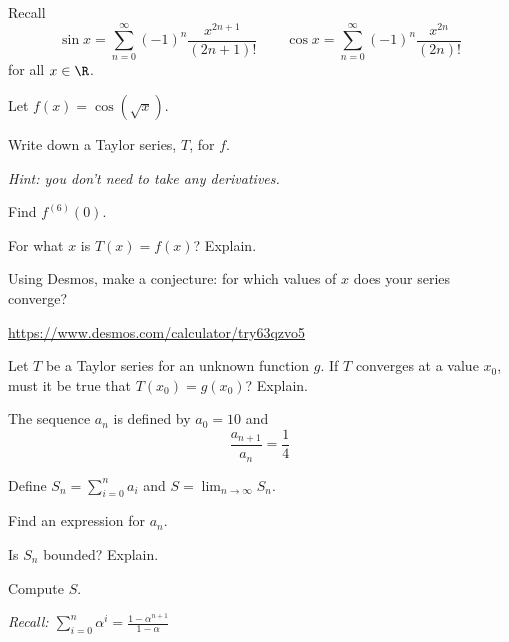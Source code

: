 \documentclass{workbook}
\begin{document}
\begin{slide}
	\question
	Recall
	\[
		\sin x = \sum_{n=0}^\infty (-1)^n\frac{x^{2n+1}}{(2n+1)!}
		\qquad
		\cos x = \sum_{n=0}^\infty (-1)^n\frac{x^{2n}}{(2n)!}
	\]
	for all $x\in\R$.

	Let $f(x)=\cos(\sqrt{x})$.

	\begin{parts}
		\item Write down a Taylor series, $T$, for $f$.

		\emph{Hint: you don't need to take any derivatives.}

		\item Find $f^{(6)}(0)$.

		\item For what $x$ is $T(x)=f(x)$? Explain.

		\item Using Desmos, make a conjecture: for which values of $x$ does your series converge?

		{\small\url{https://www.desmos.com/calculator/try63qzvo5}}

		\item Let $T$ be a Taylor series for an unknown function $g$.
		If $T$ converges at a value $x_0$, must it be true that $T(x_0)=g(x_0)$?
		Explain.

	\end{parts}
\end{slide}


\begin{slide}
	\question%
	\label{geomseq}
	The sequence $a_n$ is defined by $a_0=10$ and
	\[
		\frac{a_{n+1}}{a_n}= \frac{1}{4}
	\]

	Define $\displaystyle S_n=\sum_{i=0}^n a_i$ and
	$\displaystyle S=\lim_{n\to\infty} S_n$.

	\begin{parts}
		\item  Find an expression for $a_n$.
		\item Is $S_n$ bounded? Explain.
		\item Compute $S$.

		\emph{Recall:
			$\displaystyle
				\sum_{i=0}^n \alpha^i = \frac{1-\alpha^{n+1}}{1-\alpha}
			$}

	\end{parts}
\end{slide}
\end{document}
